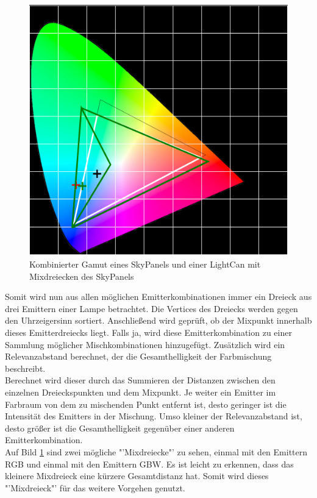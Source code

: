 \documentclass[11pt]{scrartcl}
\begin{document}
\begin{figure}[H]
    \begin{center}
        \includegraphics[width=.8\textwidth]{images/combined_gamut_with_mix_triangles_cyan.png} %
    \end{center}
    \caption{Kombinierter Gamut eines SkyPanels und einer LightCan mit Mixdreiecken des SkyPanels}\label{fig:triangleCombined}
\end{figure}
\noindent
Somit wird nun aus allen möglichen Emitterkombinationen immer ein Dreieck aus drei Emittern einer Lampe betrachtet. Die Vertices des Dreiecks werden gegen
den Uhrzeigersinn sortiert. Anschließend wird geprüft, ob der Mixpunkt innerhalb dieses Emitterdreiecks liegt. Falls ja, wird diese Emitterkombination zu einer
Sammlung möglicher Mischkombinationen hinzugefügt. Zusätzlich wird ein Relevanzabstand berechnet, der die Gesamthelligkeit der Farbmischung beschreibt.\\
Berechnet wird dieser durch das Summieren der Distanzen zwischen den einzelnen Dreieckspunkten und dem Mixpunkt. Je weiter ein Emitter im Farbraum von dem zu
mischenden Punkt entfernt ist, desto geringer ist die Intensität des Emitters in der Mischung. Umso kleiner der Relevanzabstand ist, desto größer ist die Gesamthelligkeit gegenüber einer anderen Emitterkombination.\\
Auf Bild \ref{fig:triangleCombined} sind zwei mögliche "'Mixdreiecke"' zu sehen, einmal mit den Emittern RGB und einmal mit den Emittern GBW. Es ist leicht
zu erkennen, dass das kleinere Mixdreieck eine kürzere Gesamtdistanz hat. Somit wird dieses "'Mixdreieck"' für das weitere Vorgehen genutzt.\\
\end{document}
